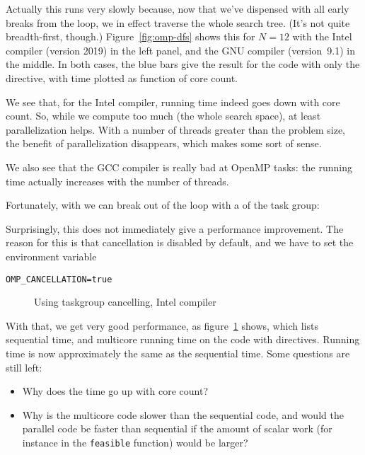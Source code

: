 Actually this runs very slowly because,
now that we've dispensed with all early breaks from the loop,
we in effect traverse the whole search tree.
(It's not quite breadth-first, though.)
%
Figure~\ref{fig:omp-dfs} shows this for $N=12$
with the Intel compiler (version 2019) in the left panel,
and the GNU compiler (version~9.1) in the middle.
In both cases,  the blue bars give the result for the code
with only the  directive,
with time plotted as function of core count.

We see that, for the Intel compiler, running time indeed
goes down with core count.
So, while we compute too much (the whole search space),
at least parallelization helps.
With a number of threads greater than the problem size,
the benefit of parallelization disappears,
which makes some sort of sense.

We also see that the GCC compiler is really bad at OpenMP tasks:
the running time actually increases with the number of threads.

Fortunately, with  we can break out of the loop
with a  of the task group:
%

Surprisingly, this does not immediately give a performance improvement.
The reason for this is that cancellation is disabled by default,
and we have to set the environment variable
\begin{verbatim}
OMP_CANCELLATION=true
\end{verbatim}

\begin{figure}
  \caption{Using taskgroup cancelling, Intel compiler}
  \label{fig:omp-dfs-cancel}
\end{figure}

With that, we get very good performance,
as  figure~\ref{fig:omp-dfs-cancel} shows,
which lists sequential time, and
multicore running time on the code with  directives.
Running time is now approximately the same as the sequential time.
Some questions are still left:
\begin{itemize}
\item Why does the time go up with core count?
\item Why is the multicore code slower than the sequential code,
  and would the parallel code be faster than sequential if the
  amount of scalar work (for instance in the \lstinline{feasible} function)
  would be larger?
\end{itemize}

